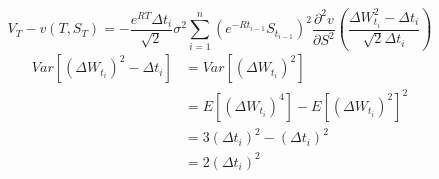 \documentclass{article}
\theoremstyle{plain}
\theoremstyle{definition}
\begin{document}
\begin{equation}
V_T-v(T,S_T)=-\frac{e^{RT}\Delta t_i}{\sqrt{2}}\sigma^2\sum_{i=1}^n (e^{-Rt_{i-1}}S_{t_{i-1}})^2\frac{\partial^2 v}{\partial S^2}(\frac{\Delta W_{t_i}^2-\Delta t_i}{\sqrt{2}\Delta t_i})
\end{equation}
\begin{equation}
\begin{split}
Var[(\Delta W_{t_i})^2-\Delta t_i]&=Var[(\Delta W_{t_i})^2]\\
&=E[(\Delta W_{t_i})^4]-E[(\Delta W_{t_i})^2]^2\\
&=3(\Delta t_i)^2-(\Delta t_i)^2\\
&=2(\Delta t_i)^2
\end{split}
\end{equation}
\end{document}
